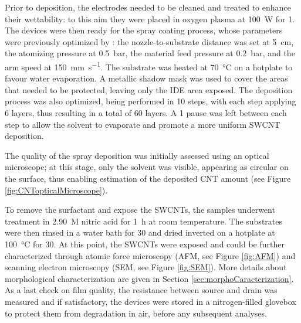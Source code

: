 Prior to deposition, the electrodes needed to be cleaned and treated to enhance their wettability: to this aim they were placed in oxygen plasma at \SI{100}{\watt} for \SI{1}{\min}. The devices were then ready for the spray coating process, whose parameters were previously optimized by \citet{shkodraOptimization2023}: the nozzle-to-substrate distance was set at \SI{5}{\cm}, the atomizing pressure at \SI{0.5}{\bar}, the material feed pressure at \SI{0.2}{\bar}, and the arm speed at \SI{150}{\mm\per\s}. The substrate was heated at \SI{70}{\celsius} on a hotplate to favour water evaporation. A metallic shadow mask was used to cover the areas that needed to be protected, leaving only the IDE area exposed. The deposition process was also optimized, being performed in 10 steps, with each step applying 6 layers, thus resulting in a total of 60 layers. A \SI{1}{\min} pause was left between each step to allow the solvent to evaporate and promote a more uniform SWCNT deposition.

The quality of the spray deposition was initially assessed using an optical microscope; at this stage, only the solvent was visible, appearing as circular  on the surface, thus enabling estimation of the deposited CNT amount (see Figure \ref{fig:CNTopticalMicroscope}).

To remove the surfactant and expose the SWCNTs, the samples underwent treatment in \SI{2.90}{M} nitric acid for \SI{1}{\hour} at room temperature. The substrates were then rinsed in a water bath for \SI{30}{\min} and dried inverted on a hotplate at \SI{100}{\celsius} for \SI{30}{\min}. At this point, the SWCNTs were exposed and could be further characterized through atomic force microscopy (AFM, see Figure \ref{fig:AFM}) and scanning electron microscopy (SEM, see Figure \ref{fig:SEM}). More details about morphological characterization are given in Section \ref{sec:morphoCaracterization}. As a last check on film quality, the resistance between source and drain was measured and if satisfactory, the devices were stored in a nitrogen-filled glovebox to protect them from degradation in air, before any subsequent analyses.

